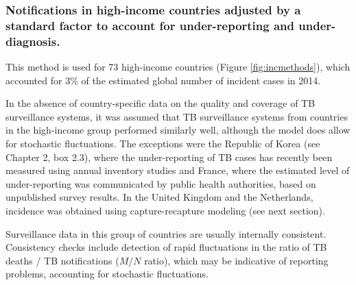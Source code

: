 \subsubsection {Notifications in high-income countries adjusted by a standard factor to account for under-reporting and under-diagnosis.} This method is used for 73 high-income countries (Figure \ref{fig:incmethods}), which accounted for 3\% of the estimated global number of incident cases in 2014.

In the absence of country-specific data on the quality and coverage of TB surveillance systems, it was assumed that TB surveillance systems from countries in the high-income group performed similarly well, although the model does allow for stochastic fluctuations. The exceptions were the Republic of Korea (see Chapter 2, box 2.3), where the under-reporting of TB cases has recently been measured using annual inventory studies and France, where the estimated level of under-reporting was communicated by public health authorities, based on unpublished survey results. In the United Kingdom and the Netherlands, incidence was obtained using capture-recapture modeling (see next section).

Surveillance data in this group of countries are usually internally consistent. Consistency checks include detection of rapid fluctuations in the ratio of TB deaths / TB notifications ($M/N$ ratio), which may be indicative of reporting problems, accounting for stochastic fluctuations.




